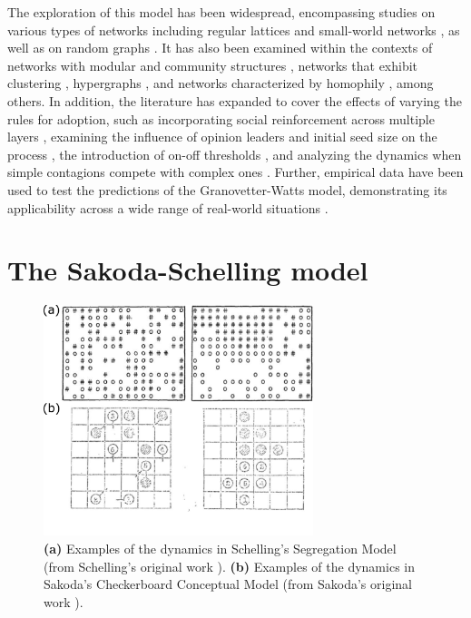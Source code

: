 The exploration of this model has been widespread, encompassing studies on various types of networks including regular lattices and small-world networks \cite{centola-2007}, as well as on random graphs \cite{gleeson-2007}. It has also been examined within the contexts of networks with modular and community structures \cite{gleeson-2008}, networks that exhibit clustering \cite{hackett-2011,hackett-2013}, hypergraphs \cite{de-arruda-2020}, and networks characterized by homophily \cite{diaz-diaz-2022}, among others. In addition, the literature has expanded to cover the effects of varying the rules for adoption, such as incorporating social reinforcement across multiple layers \cite{chen-2018}, examining the influence of opinion leaders and initial seed size on the process \cite{liu-2018, singh-2013}, the introduction of on-off thresholds \cite{dodds-2013}, and analyzing the dynamics when simple contagions compete with complex ones \cite{czaplicka-2016, min-2018, diaz-diaz-2022}. Further, empirical data have been used to test the predictions of the Granovetter-Watts model, demonstrating its applicability across a wide range of real-world situations \cite{centola-2010, karimi-2013, karsai-2014, rosenthal-2015, karsai-2016, mnsted-2017, unicomb-2018, guilbeault-2021}.

\section{\label{sec:The Sakoda-Schelling model} The Sakoda-Schelling model}

\begin{figure}
    \centering
    \captionsetup{font=sf}
    \includegraphics[width=0.7\textwidth]{Figs/Introduction/schelling_diagrams.png}
    \caption[Schelling and Sakoda checkerboard examples]{\textbf{(a)} Examples of the dynamics in Schelling's Segregation Model (from Schelling's original work \cite{Schelling}). \textbf{(b)} Examples of the dynamics in Sakoda’s Checkerboard Conceptual Model (from Sakoda's original work \cite{sakoda1949minidoka}).}
    \label{fig:Schelling_fig}
\end{figure}

